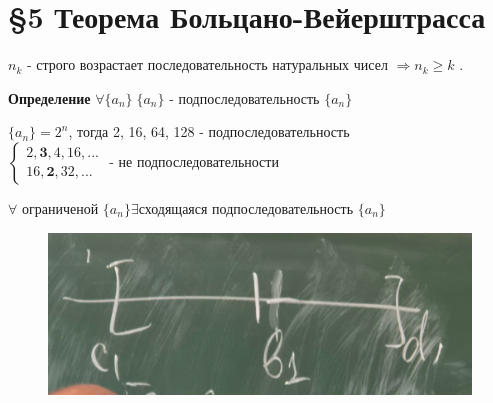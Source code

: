 \documentclass[12pt, paper]{article}
\begin{document}
\section{\S 5 Теорема Больцано-Вейерштрасса}
$n_k$ - строго возрастает последовательность натуральных чисел $\Rightarrow n_k\geq k$ .

\begin{tcolorbox}
    \textbf{Определение} $\forall \{a_n\} \; \{a_n\}$ - подпоследовательность $\{a_n\}$
\end{tcolorbox}
$\{a_n\} = 2^n$, тогда 2, 16, 64, 128 - подпоследовательность\\
$\begin{cases}
    2, \textbf{3}, 4, 16, ...\\
    16, \textbf{2}, 32, ...     
\end{cases}$ - не подпоследовательности\\

\begin{tcolorbox}[title=Теорема Больцано-Вейерштрасса]
    $ \forall $ ограниченой $\{a_n\} \exists $сходящаяся подпоследовательность $ \{a_n\} $
\end{tcolorbox}

\begin{figure}[h]
    \centering
    \includegraphics[width=0.5\linewidth]{Т Б-В.png}
\end{figure}
\end{document}
